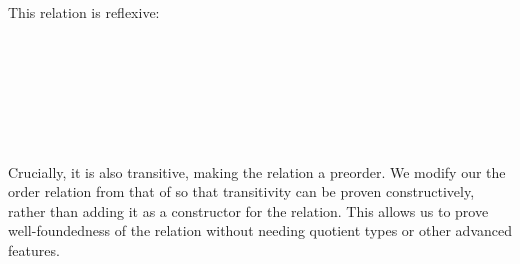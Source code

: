       This relation is reflexive:
\begin{code}%
\>[0][@{}l@{\AgdaIndent{1}}]%
\>[4]\AgdaSpace{}%
\AgdaSymbol{:}\AgdaSpace{}%
\AgdaSpace{}%
\AgdaSpace{}%
\AgdaSpace{}%
\AgdaSpace{}%
\AgdaSpace{}%
\<%
\\
%
\>[4]\AgdaSpace{}%
\AgdaSpace{}%
\AgdaSymbol{=}\AgdaSpace{}%
\<%
\\
%
\>[4]\AgdaSpace{}%
\AgdaSymbol{(}\AgdaSpace{}%
\AgdaSymbol{)}\AgdaSpace{}%
\AgdaSymbol{=}\AgdaSpace{}%
\AgdaSpace{}%
\AgdaSymbol{(}\AgdaSpace{}%
\AgdaSymbol{)}\<%
\\
%
\>[4]\AgdaSpace{}%
\AgdaSymbol{(}\AgdaSpace{}%
\AgdaSpace{}%
\AgdaSymbol{)}\<%
\\
\>[4][@{}l@{\AgdaIndent{0}}]%
\>[6]\AgdaSymbol{=}\AgdaSpace{}%
\AgdaSpace{}%
\AgdaSpace{}%
\AgdaSpace{}%
\AgdaSpace{}%
\AgdaSpace{}%
\AgdaSpace{}%
\AgdaSpace{}%
\AgdaSpace{}%
\AgdaSymbol{(}\AgdaSpace{}%
\AgdaSymbol{(}\AgdaSpace{}%
\AgdaSymbol{)))}\<%
\end{code}
\begin{code}[hide]%
%
\>[4]\AgdaSpace{}%
\AgdaSymbol{:}\AgdaSpace{}%
\AgdaSpace{}%
\AgdaSymbol{\{}\AgdaSpace{}%
\AgdaSymbol{\}}\AgdaSpace{}%
\AgdaSpace{}%
\AgdaSpace{}%
\AgdaSpace{}%
\AgdaSpace{}%
\AgdaSpace{}%
\AgdaSpace{}%
\AgdaSpace{}%
\<%
\\
%
\>[4]\AgdaSpace{}%
\AgdaSpace{}%
\AgdaSymbol{=}\AgdaSpace{}%
\AgdaSpace{}%
\AgdaSymbol{\AgdaUnderscore{}}\<%
\end{code}

      Crucially, it is also transitive, making the relation a preorder.
We modify our the order relation from that of \citet{KRAUS2023113843}
so that transitivity can be proven constructively, rather than adding it as a constructor
for the relation. This allows us to prove well-foundedness of the relation without needing
quotient types or other advanced features.


